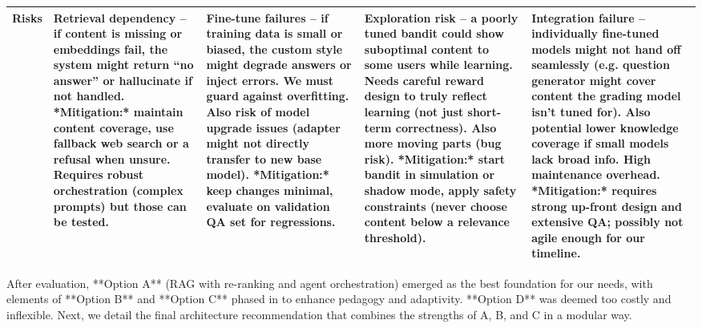 \documentclass[11pt]{article}
\begin{document}
\begin{table}[h!]
\begin{tabular}{p{2.8cm} p{3.4cm} p{3.4cm} p{3.4cm} p{3.4cm}}
\textbf{Risks} & Retrieval dependency – if content is missing or embeddings fail, the system might return “no answer” or hallucinate if not handled. *Mitigation:* maintain content coverage, use fallback web search or a refusal when unsure. Requires robust orchestration (complex prompts) but those can be tested. & Fine-tune failures – if training data is small or biased, the custom style might degrade answers or inject errors. We must guard against overfitting. Also risk of model upgrade issues (adapter might not directly transfer to new base model). *Mitigation:* keep changes minimal, evaluate on validation QA set for regressions. & Exploration risk – a poorly tuned bandit could show suboptimal content to some users while learning. Needs careful reward design to truly reflect learning (not just short-term correctness). Also more moving parts (bug risk). *Mitigation:* start bandit in simulation or shadow mode, apply safety constraints (never choose content below a relevance threshold). & Integration failure – individually fine-tuned models might not hand off seamlessly (e.g. question generator might cover content the grading model isn’t tuned for). Also potential lower knowledge coverage if small models lack broad info. High maintenance overhead. *Mitigation:* requires strong up-front design and extensive QA; possibly not agile enough for our timeline. \\
\bottomrule
\end{tabular}
\end{table}

After evaluation, **Option A** (RAG with re-ranking and agent orchestration) emerged as the best foundation for our needs, with elements of **Option B** and **Option C** phased in to enhance pedagogy and adaptivity. **Option D** was deemed too costly and inflexible. Next, we detail the final architecture recommendation that combines the strengths of A, B, and C in a modular way.
\end{document}
